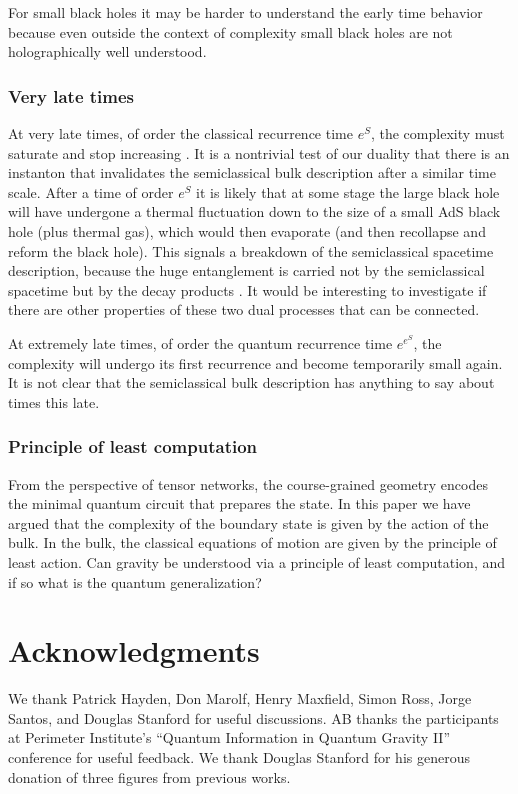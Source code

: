 \documentclass[12pt]{article}
\numberwithin{equation}{section}
\begin{document}
For small black holes it may be harder to understand the early time behavior because even outside the context of complexity small black holes are not holographically well understood.


\subsubsection{Very late times}

At very late times, of order the classical recurrence time $e^S$, the complexity must saturate and stop increasing \cite{opacity}. It is a nontrivial test of our duality that there is an instanton that invalidates the semiclassical bulk description after a similar time scale. After a time of order $e^S$ it is likely that at some stage the large black hole will have undergone a thermal fluctuation down to the size of a small AdS black hole (plus thermal gas), which would then evaporate (and then recollapse and reform the black hole).
This signals a breakdown of the semiclassical spacetime description, because the huge entanglement is carried not by the semiclassical spacetime but by the decay products \cite{Maldacena:2001kr,Maldacena:2013xja}.  It would be interesting to investigate if there are other properties of these two dual processes that can be connected.

At extremely late times, of order the quantum recurrence time $e^{e^S}$, the complexity will undergo its first recurrence and become temporarily small again. It is not clear that the semiclassical bulk description has anything to say about times this late.


\subsubsection{Principle of least computation}

From the perspective of tensor networks, the course-grained geometry encodes the minimal quantum circuit that prepares the state. In this paper we have argued that the complexity of the boundary state is given by the action of the bulk. In the bulk, the classical equations of motion are given by the principle of least action. Can gravity be understood via a principle of least computation, and if so what is the  quantum generalization?



\section*{Acknowledgments}
We thank Patrick Hayden, Don Marolf,  Henry Maxfield, Simon Ross, Jorge Santos, and Douglas Stanford for useful discussions. AB thanks the participants at Perimeter Institute's ``Quantum Information in Quantum Gravity II'' conference for useful feedback.  We thank Douglas Stanford for his generous donation of three figures from previous works.
\end{document}
